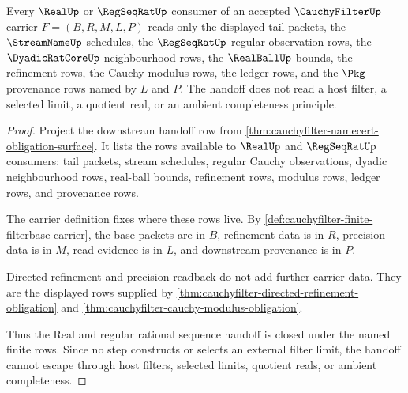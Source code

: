 \begin{theorem}
\label{thm:cauchyfilter-real-regseq-handoff-nonescape}
Every $\RealUp$ or $\RegSeqRatUp$ consumer of an accepted $\CauchyFilterUp$
carrier $F=(B,R,M,L,P)$ reads only the displayed tail packets, the
$\StreamNameUp$ schedules, the $\RegSeqRatUp$ regular observation rows, the
$\DyadicRatCoreUp$ neighbourhood rows, the
$\RealBallUp$ bounds, the refinement rows, the Cauchy-modulus rows, the ledger
rows, and the $\Pkg$ provenance rows named by $L$ and $P$. The handoff does
not read a host filter, a selected limit, a quotient real, or an ambient
completeness principle.
\end{theorem}
\begin{proof}
Project the downstream handoff row from
\autoref{thm:cauchyfilter-namecert-obligation-surface}. It lists the rows
available to $\RealUp$ and $\RegSeqRatUp$ consumers: tail packets, stream
schedules, regular Cauchy observations, dyadic neighbourhood rows, real-ball
bounds, refinement rows, modulus rows, ledger rows, and provenance rows.

The carrier definition fixes where these rows live. By
\autoref{def:cauchyfilter-finite-filterbase-carrier}, the base packets are in
$B$, refinement data is in $R$, precision data is in $M$, read evidence is in
$L$, and downstream provenance is in $P$.

Directed refinement and precision readback do not add further carrier data.
They are the displayed rows supplied by
\autoref{thm:cauchyfilter-directed-refinement-obligation} and
\autoref{thm:cauchyfilter-cauchy-modulus-obligation}.

Thus the Real and regular rational sequence handoff is closed under the named
finite rows. Since no step constructs or selects an external filter limit, the
handoff cannot escape through host filters, selected limits, quotient reals,
or ambient completeness.
\end{proof}

